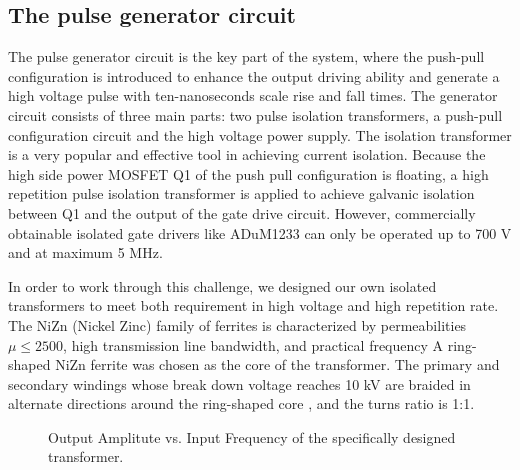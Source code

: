 \documentclass[aip,rsi,reprint,graphicx]{revtex4-1} %
\begin{document}

\subsection{The pulse generator circuit}
The pulse generator circuit is the key part of the system, where the push-pull configuration is introduced to enhance the output driving ability and generate a high voltage pulse with ten-nanoseconds scale rise and fall times. 
The generator circuit consists of three main parts: two pulse isolation transformers, a push-pull configuration circuit and the high voltage power supply.
 The isolation transformer is a very popular and effective tool in achieving current isolation. 
 Because the high side power MOSFET Q1 of the push pull configuration is floating, a high repetition pulse isolation transformer is applied to achieve galvanic isolation between Q1 and the output of the gate drive circuit. 
 However, commercially obtainable isolated gate drivers like ADuM1233 can only be operated up to 700 V and at maximum 5 MHz.

 In order to work through this challenge, we designed our own isolated transformers to meet both requirement in high voltage and high repetition rate.
 The NiZn (Nickel Zinc) family of ferrites is characterized by permeabilities $\mu\le2500$,  high transmission line bandwidth, and practical frequency%
 A ring-shaped NiZn ferrite was chosen as the core of the transformer.
 The primary and secondary windings whose break down voltage reaches 10 kV are braided in alternate directions around the ring-shaped core %
, and the turns ratio is 1:1.

\begin{figure}[hbt]
{}  
  \caption{Output Amplitute vs. Input Frequency of the specifically designed transformer.\label{FIG8}}
\end{figure}
\end{document}
